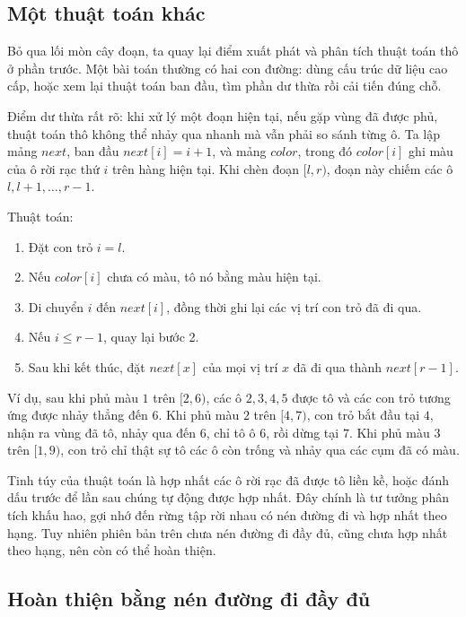 \documentclass[11pt]{article}
\begin{document}
\subsection{Một thuật toán khác}

Bỏ qua lối mòn cây đoạn, ta quay lại điểm xuất phát và phân tích thuật toán
thô ở phần trước. Một bài toán thường có hai con đường: dùng cấu trúc dữ liệu
cao cấp, hoặc xem lại thuật toán ban đầu, tìm phần dư thừa rồi cải tiến đúng
chỗ.

Điểm dư thừa rất rõ: khi xử lý một đoạn hiện tại, nếu gặp vùng đã được phủ,
thuật toán thô không thể nhảy qua nhanh mà vẫn phải so sánh từng ô. Ta lập
mảng \(\mathit{next}\), ban đầu \(\mathit{next}[i]=i+1\), và mảng
\(\mathit{color}\), trong đó \(\mathit{color}[i]\) ghi màu của ô rời rạc thứ
\(i\) trên hàng hiện tại. Khi chèn đoạn \([l,r)\), đoạn này chiếm các ô
\(l,l+1,\ldots,r-1\).

Thuật toán:
\begin{enumerate}
  \item Đặt con trỏ \(i=l\).
  \item Nếu \(\mathit{color}[i]\) chưa có màu, tô nó bằng màu hiện tại.
  \item Di chuyển \(i\) đến \(\mathit{next}[i]\), đồng thời ghi lại các vị
  trí con trỏ đã đi qua.
  \item Nếu \(i\le r-1\), quay lại bước 2.
  \item Sau khi kết thúc, đặt \(\mathit{next}[x]\) của mọi vị trí \(x\) đã đi
  qua thành \(\mathit{next}[r-1]\).
\end{enumerate}

Ví dụ, sau khi phủ màu \(1\) trên \([2,6)\), các ô \(2,3,4,5\) được tô và các
con trỏ tương ứng được nhảy thẳng đến \(6\). Khi phủ màu \(2\) trên \([4,7)\),
con trỏ bắt đầu tại \(4\), nhận ra vùng đã tô, nhảy qua đến \(6\), chỉ tô ô
\(6\), rồi dừng tại \(7\). Khi phủ màu \(3\) trên \([1,9)\), con trỏ chỉ thật
sự tô các ô còn trống và nhảy qua các cụm đã có màu.

Tinh túy của thuật toán là hợp nhất các ô rời rạc đã được tô liền kề, hoặc
đánh dấu trước để lần sau chúng tự động được hợp nhất. Đây chính là tư tưởng
phân tích khấu hao, gợi nhớ đến rừng tập rời nhau có nén đường đi và hợp nhất
theo hạng. Tuy nhiên phiên bản trên chưa nén đường đi đầy đủ, cũng chưa hợp
nhất theo hạng, nên còn có thể hoàn thiện.

\subsection{Hoàn thiện bằng nén đường đi đầy đủ}
\end{document}
